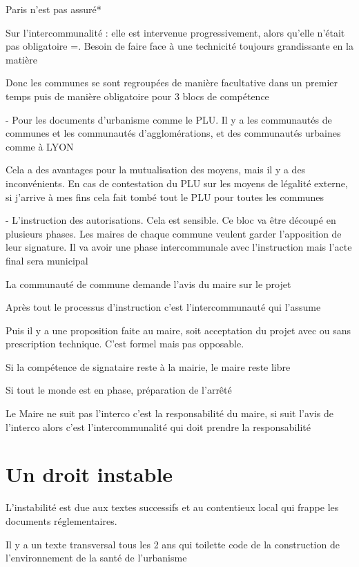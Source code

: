 		Paris n’est pas assuré*

		
		Sur l’intercommunalité : elle est intervenue progressivement, alors qu’elle n’était pas obligatoire =. Besoin de faire face à une technicité toujours grandissante en la matière

		Donc les communes se sont regroupées de manière facultative dans un premier temps puis de manière obligatoire pour 3 blocs de compétence

		-	Pour les documents d’urbanisme comme le PLU. Il y a les communautés de communes et les communautés d’agglomérations, et des communautés urbaines comme à LYON

		Cela a des avantages pour la mutualisation des moyens, mais il y a des inconvénients. En cas de contestation du PLU sur les moyens de légalité externe, si j’arrive à mes fins cela fait tombé tout le PLU pour toutes les communes

		
		-	L’instruction des autorisations. Cela est sensible. Ce bloc va être découpé en plusieurs phases. Les maires de chaque commune veulent garder l’apposition de leur signature. Il va avoir une phase intercommunale avec l’instruction mais l’acte final sera municipal 

		La communauté de commune demande l’avis du maire sur le projet

		Après tout le processus d’instruction c’est l’intercommunauté qui l’assume

		Puis il y a une proposition faite au maire, soit acceptation du projet avec ou sans prescription technique. C’est formel mais pas opposable.

		Si la compétence de signataire reste à la mairie, le maire reste libre 

		Si tout le monde est en phase, préparation de l’arrêté

		Le Maire  ne suit pas l’interco c’est la responsabilité du maire, si suit l’avis de l’interco alors c’est l’intercommunalité qui doit prendre la responsabilité

		
	
	\section{Un droit instable}
	
		L'instabilité est due aux textes successifs et au contentieux local qui frappe les documents réglementaires.
		
		Il y a un texte transversal tous les 2 ans qui toilette code de la construction de l’environnement de la santé de l’urbanisme

